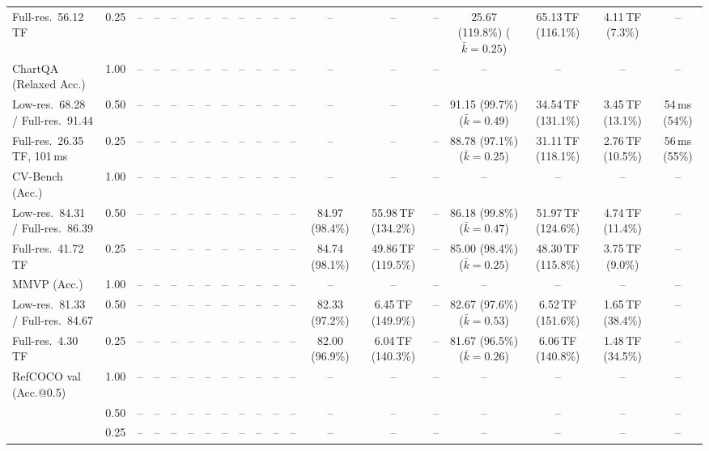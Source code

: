 \begin{table}[t]
{\begin{tabular}{l c | c c c c | c c c c | c c | c c c | c c c c}
{\footnotesize Full-res.\ 56.12\,TF} & 0.25 & -- & -- & -- & -- & -- & -- & -- & -- & -- & -- & -- & -- & -- & \cellcolor{gray!15}25.67 (119.8\%) {\footnotesize ($\bar k{=}0.25$)} & 65.13\,TF (116.1\%) & 4.11\,TF (7.3\%) & -- \\
\cmidrule(lr){1-19}
ChartQA (Relaxed Acc.) & 1.00 & -- & -- & -- & -- & -- & -- & -- & -- & -- & -- & -- & -- & -- & -- & -- & -- & -- \\
{\footnotesize Low-res.\ 68.28 / Full-res.\ 91.44} & 0.50 & -- & -- & -- & -- & -- & -- & -- & -- & -- & -- & -- & -- & -- & \cellcolor{gray!15}91.15 (99.7\%) {\footnotesize ($\bar k{=}0.49$)} & 34.54\,TF (131.1\%) & 3.45\,TF (13.1\%) & 54\,ms (54\%) \\
{\footnotesize Full-res.\ 26.35\,TF, 101\,ms} & 0.25 & -- & -- & -- & -- & -- & -- & -- & -- & -- & -- & -- & -- & -- & 88.78 (97.1\%) {\footnotesize ($\bar k{=}0.25$)} & 31.11\,TF (118.1\%) & 2.76\,TF (10.5\%) & 56\,ms (55\%) \\
\cmidrule(lr){1-19}
CV-Bench (Acc.) & 1.00 & -- & -- & -- & -- & -- & -- & -- & -- & -- & -- & -- & -- & -- & -- & -- & -- & -- \\
{\footnotesize Low-res.\ 84.31 / Full-res.\ 86.39} & 0.50 & -- & -- & -- & -- & -- & -- & -- & -- & -- & -- & \cellcolor{gray!15}84.97 (98.4\%) & 55.98\,TF (134.2\%) & -- & \cellcolor{gray!15}86.18 (99.8\%) {\footnotesize ($\bar k{=}0.47$)} & 51.97\,TF (124.6\%) & 4.74\,TF (11.4\%) & -- \\
{\footnotesize Full-res.\ 41.72\,TF} & 0.25 & -- & -- & -- & -- & -- & -- & -- & -- & -- & -- & \cellcolor{gray!15}84.74 (98.1\%) & 49.86\,TF (119.5\%) & -- & \cellcolor{gray!15}85.00 (98.4\%) {\footnotesize ($\bar k{=}0.25$)} & 48.30\,TF (115.8\%) & 3.75\,TF (9.0\%) & -- \\
\cmidrule(lr){1-19}
MMVP (Acc.) & 1.00 & -- & -- & -- & -- & -- & -- & -- & -- & -- & -- & -- & -- & -- & -- & -- & -- & -- \\
{\footnotesize Low-res.\ 81.33 / Full-res.\ 84.67} & 0.50 & -- & -- & -- & -- & -- & -- & -- & -- & -- & -- & 82.33 (97.2\%) & 6.45\,TF (149.9\%) & -- & 82.67 (97.6\%) {\footnotesize ($\bar k{=}0.53$)} & 6.52\,TF (151.6\%) & 1.65\,TF (38.4\%) & -- \\
{\footnotesize Full-res.\ 4.30\,TF} & 0.25 & -- & -- & -- & -- & -- & -- & -- & -- & -- & -- & 82.00 (96.9\%) & 6.04\,TF (140.3\%) & -- & 81.67 (96.5\%) {\footnotesize ($\bar k{=}0.26$)} & 6.06\,TF (140.8\%) & 1.48\,TF (34.5\%) & -- \\
\cmidrule(lr){1-19}
RefCOCO val (Acc.@0.5) & 1.00 & -- & -- & -- & -- & -- & -- & -- & -- & -- & -- & -- & -- & -- & -- & -- & -- & -- \\
 & 0.50 & -- & -- & -- & -- & -- & -- & -- & -- & -- & -- & -- & -- & -- & -- & -- & -- & -- \\
 & 0.25 & -- & -- & -- & -- & -- & -- & -- & -- & -- & -- & -- & -- & -- & -- & -- & -- & -- \\
\bottomrule
\end{tabular}}
\end{table}
